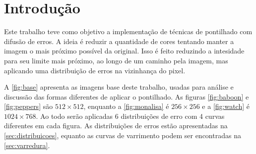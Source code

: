 \section{Introdução} \label{sec:intro}

Este trabalho teve como objetivo a implementação de técnicas de pontilhado com difusão de erros. A ideia é reduzir a quantidade de cores tentando manter a imagem o mais próximo possível da original. Isso é feito reduzindo a intesidade para seu limite mais próximo, ao longo de um caminho pela imagem, mas aplicando uma distribuição de erros na vizinhança do pixel.

A \cref{fig:base} apresenta as imagens base deste trabalho, usadas para análise e discussão das formas diferentes de aplicar o pontilhado. As figuras \ref{fig:baboon} e \ref{fig:peppers} são $512 \times 512$, enquanto a \cref{fig:monalisa} é $256 \times 256$ e a \cref{fig:watch} é $1024 \times 768$. Ao todo serão aplicadas 6 distribuições de erro com 4 curvas diferentes em cada figura. As distribuições de erros estão apresentadas na \cref{sec:distribuicoes}, equanto as curvas de varrimento podem ser encontradas na \cref{sec:varredura}.

%     

